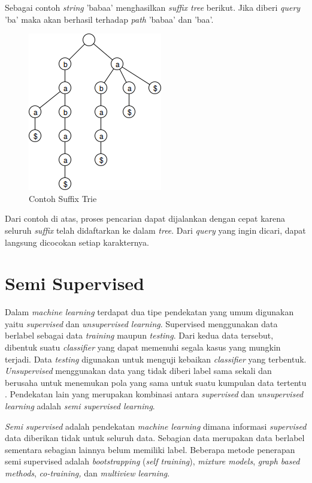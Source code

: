 Sebagai contoh \textit{string} 'babaa' menghasilkan \textit{suffix tree} berikut. Jika diberi \textit{query} 'ba' maka akan berhasil terhadap \textit{path} 'babaa' dan 'baa'.
\begin{figure}
    \centering
    \includegraphics[scale=0.6]{pics/Contoh-SuffixTree}
    \caption{Contoh Suffix Trie}
    \label{fig:contoh-suffix-trie}
\end{figure}

\noindent Dari contoh di atas, proses pencarian dapat dijalankan dengan cepat karena seluruh \textit{suffix} telah didaftarkan ke dalam \textit{tree}. Dari \textit{query} yang ingin dicari, dapat langsung dicocokan setiap karakternya.


\section{Semi Supervised}
Dalam \textit{machine learning} terdapat dua tipe pendekatan yang umum digunakan yaitu \textit{supervised} dan \textit{unsupervised learning}. Supervised menggunakan data berlabel sebagai data \textit{training} maupun \textit{testing}. Dari kedua data tersebut, dibentuk suatu \textit{classifier} yang dapat memenuhi segala kasus yang mungkin terjadi. Data \textit{testing} digunakan untuk menguji kebaikan \textit{classifier} yang terbentuk. \textit{Unsupervised} menggunakan data yang tidak diberi label sama sekali dan berusaha untuk menemukan pola yang sama untuk suatu kumpulan data tertentu \citep{prakash2014survey}. Pendekatan lain yang merupakan kombinasi antara \textit{supervised} dan \textit{unsupervised learning} adalah \textit{semi supervised learning}. 

\textit{Semi supervised} adalah pendekatan \textit{machine learning} dimana informasi \textit{supervised} data diberikan tidak untuk seluruh data. Sebagian data merupakan data berlabel sementara sebagian lainnya belum memiliki label. Beberapa metode penerapan semi supervised adalah \textit{bootstrapping} (\textit{self training}), \textit{mixture models}, \textit{graph based methods}, \textit{co-training,} dan \textit{multiview learning}.

